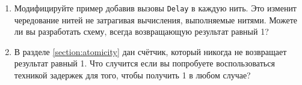 \begin{enumerate}
{\begin{enumerate}
\item{Модифицируйте пример добавив вызовы \lstinline|Delay| в каждую нить. Это изменит чередование нитей не затрагивая вычисления, выполняемые нитями. Можете ли вы разработать схему, всегда возвращающую результат равный 1?}

\item{В разделе \ref{section:atomicity} дан счётчик, который никогда не возвращает результат равный 1. Что случится если вы попробуете воспользоваться техникой задержек для того, чтобы получить 1 в любом случае?}
  \end{enumerate}
}
\end{enumerate}
